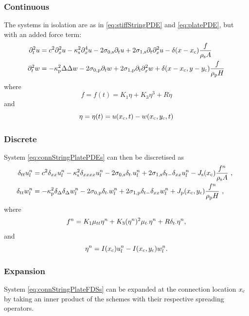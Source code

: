 \subsubsection{Continuous}
The systems in isolation are as in \eqref{eq:stiffStringPDE} and \eqref{eq:platePDE}, but with an added force term:
\begin{subequations}\label{eq:connStringPlatePDEs}
\begin{align}
    \ptt u &= c^2 \pxx u - \kappa_\stxt^2 \pxxxx u - 2\szX[\stxt]\pt u + 2\soX[\stxt] \pt\pxx u - \delta(x-x_\ctxt)\frac{f}{\rho_\stxt A}\\
   \ptt w &= -\kappa_\ptxt^2\Delta\Delta w - 2\szX[\ptxt]\pt w + 2\soX[\ptxt] \pt\pxx w + \delta(x-x_\ctxt, y-y_\ctxt)\frac{f}{ \rho_\ptxt H}
\end{align}
\end{subequations}
where
\begin{equation}
    f = f(t) = K_1\eta+K_3\eta^3+R \dot\eta
\end{equation}
and
\begin{equation}
    \eta = \eta(t) = u(x_{\text{c}}, t) - w(x_{\text{c}}, y_{\text{c}}, t)
\end{equation}

\subsubsection{Discrete}
System \eqref{eq:connStringPlatePDEs} can then be discretised as
\begin{align}\label{eq:connStringPlateFDSs}
    \!\!\!\dtt \uln &= c^2 \dxx \uln - \kappa_\stxt^2 \dxxxx \uln - 2\szX[\stxt]\dtd \uln + 2\soX[\stxt] \dtm\dxx \uln - J_\stxt(x_\ctxt)\frac{f^n}{\rho_\stxt A}\ ,\\
    \!\!\!\dtt \wln &= -\kappa_\ptxt^2\dTwoD\dTwoD \wln - 2\szX[\ptxt]\dtd \wln + 2\soX[\ptxt] \dtm\dxx \wln + J_\ptxt(x_\ctxt, y_\ctxt)\frac{f^n}{ \rho_\ptxt H}\ ,
\end{align}
where
\begin{equation}
    f^n = K_1\mu_{tt}\eta^n+K_3(\eta^n)^2\mu_{t\cdot}\eta^n+R\delta_{t\cdot}\eta^n,
\end{equation}
and
\begin{equation}
    \eta^n = I(x_{\text{c}})u_l^n - I(x_{\text{c}}, y_{\text{c}})w_l^n.
\end{equation}

\subsubsection{Expansion}
System \eqref{eq:connStringPlateFDSs} can be expanded at the connection location $x_{\text{c}}$ by taking an inner product of the schemes with their respective spreading operators. 


